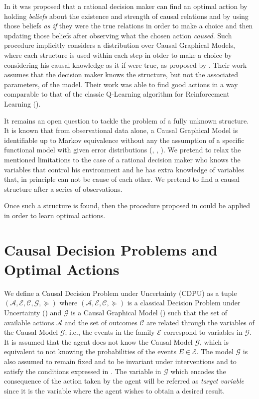 \documentclass[letterpaper]{article}
\begin{document}
In \cite{gonzalez2018playing} it was proposed that a rational decision maker can find an optimal action by holding \textit{beliefs} about the existence and strength of causal relations and by using those beliefs \textit{as if} they were the true relations in order to make a choice and then updating those beliefs after observing what the chosen action \textit{caused}. Such procedure implicitly considers a distribution over Causal Graphical Models, where each structure is used within each step in otder to make a choice by considering his causal knowledge as it if were true, as proposed by \cite{joyce1999foundations}. Their work assumes that the decision maker knows the structure, but not the associated parameters, of the model. Their work was able to find good actions in a way comparable to that of the classic Q-Learning algorithm for Reinforcement Learning (\cite{watkins1992q}).

It remains an open question to tackle the problem of a fully unknown structure. It is known that from observational data alone, a Causal Graphical Model is identifiable up to Markov equivalence without any the assumption of a specific functional model with given error distributions (\cite{hauser2012characterization}, \cite{hauser2012two}, \cite{peters2011identifiability}). We pretend to relax the mentioned limitations to the case of a rational decision maker who knows the variables that control his environment and he has extra knowledge of variables that, in principle can not be cause of each other. We pretend to find a causal structure after a series of observations. 

Once such a structure is found, then the procedure proposed in \cite{gonzalez2018playing} could be applied in order to learn optimal actions.

\section{Causal Decision Problems and Optimal Actions}{\label{CDPU}}
We define a Causal Decision Problem under Uncertainty (CDPU) as a tuple $(\mathcal{A}, \mathcal{E}, \mathcal{C}, \mathcal{G}, \succeq)$ where  $(\mathcal{A}, \mathcal{E}, \mathcal{C}, \succeq)$ is a classical Decision Problem under Uncertainty (\cite{bernardo2000bayesian}) and $\mathcal{G}$ is a Causal Graphical Model (\cite{sucar2015probabilistic}) such that the set of available actions $\mathcal{A}$ and the set of outcomes $\mathcal{C}$ are related through the variables of the Causal Model $\mathcal{G}$; i.e., the events in the family $\mathcal{E}$ correspond to variables in $\mathcal{G}$. It is assumed that the agent does not know the Causal Model $\mathcal{G}$, which is equivalent to not knowing the probabilities of the events $E \in \mathcal{E}$. The model $\mathcal{G}$ is also assumed to remain fixed and to be invariant under interventions \cite{woodward2005making} and to satisfy the conditions expressed in \cite{spirtes2000causation}. The variable in $\mathcal{G}$ which encodes the consequence of the action taken by the agent will be referred as \textit{target variable} since it is the variable where the agent wishes to obtain a desired result. 
\end{document}
